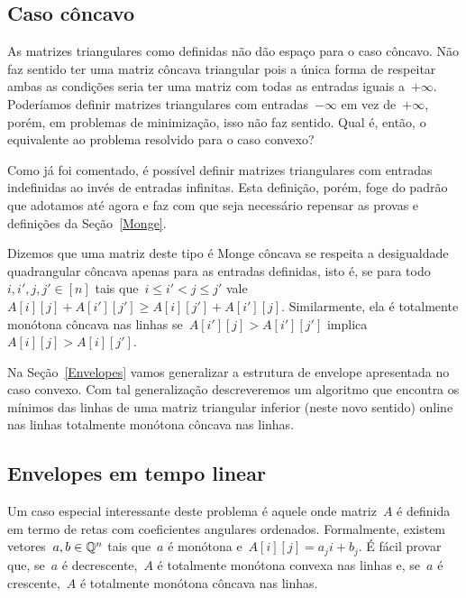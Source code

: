 
\subsection{Caso côncavo} \label{Online:concave}

As matrizes triangulares como definidas não dão espaço para o caso côncavo. Não faz sentido ter uma matriz côncava triangular pois a única forma de respeitar ambas as condições seria ter uma matriz com todas as entradas iguais a~$+\infty$. Poderíamos definir matrizes triangulares com entradas~$-\infty$ em vez de~$+\infty$, porém, em problemas de minimização, isso não faz sentido. Qual é, então, o equivalente ao problema resolvido para o caso convexo?

Como já foi comentado, é possível definir matrizes triangulares com entradas indefinidas ao invés de entradas infinitas. Esta definição, porém, foge do padrão que adotamos até agora e faz com que seja necessário repensar as provas e definições da Seção~\ref{Monge}. 

Dizemos que uma matriz deste tipo é Monge côncava se respeita a desigualdade quadrangular côncava apenas para as entradas definidas, isto é, se para todo~${ i,i',j,j' \in [n] }$ tais que~${ i \leq i' < j \leq j'}$ vale~${ A[i][j] + A[i'][j'] \geq A[i][j'] + A[i'][j] }$. Similarmente, ela é totalmente monótona côncava nas linhas se~${ A[i'][j] > A[i'][j'] }$ implica~${ A[i][j] > A[i][j'] }$. 

Na Seção~\ref{Envelopes} vamos generalizar a estrutura de envelope apresentada no caso convexo. Com tal generalização descreveremos um algoritmo que encontra os mínimos das linhas de uma matriz triangular inferior (neste novo sentido) online nas linhas totalmente monótona côncava nas linhas.


\subsection{Envelopes em tempo linear} \label{Online:linear}

Um caso especial interessante deste problema é aquele onde matriz~$A$ é definida em termo de retas com coeficientes angulares ordenados. Formalmente, existem vetores~$a,b \in \mathbb{Q}^n$ tais que~$a$ é monótona e~$A[i][j] = a_j i + b_j$. É fácil provar que, se~$a$ é decrescente,~$A$ é totalmente monótona convexa nas linhas e, se~$a$ é crescente,~$A$ é totalmente monótona côncava nas linhas.

